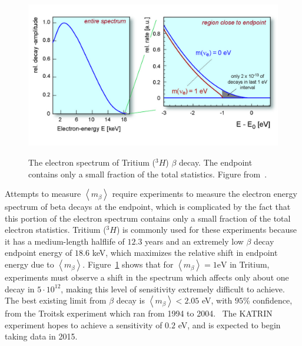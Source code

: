 \begin{figure}
\begin{center}
\includegraphics[keepaspectratio=true,width=\textwidth]{TritiumSpectrum.jpg}
\end{center}
\renewcommand{\baselinestretch}{1}
\small\normalsize
\begin{quote}
\caption{The electron spectrum of Tritium ($^3H$) $\beta$ decay.  The endpoint contains only a small fraction of the total statistics.  Figure from~\cite{Angrik:2005ep}.}
\label{fig:TritiumSpectrum}
\end{quote}
\end{figure}
\renewcommand{\baselinestretch}{2}
\small\normalsize

Attempts to measure $\left< m_\beta \right>$ require experiments to measure the electron energy spectrum of beta decays at the endpoint, which is complicated by the fact that this portion of the electron spectrum contains only a small fraction of the total electron statistics.  Tritium ($^3H$) is commonly used for these experiments because it has a medium-length halflife of $12.3$ years and an extremely low $\beta$ decay endpoint energy of $18.6$ keV, which maximizes the relative shift in endpoint energy due to $\left< m_\beta \right>$.  Figure~\ref{fig:TritiumSpectrum} shows that for $\left< m_\beta \right> = 1\text{eV}$ in Tritium, experiments must observe a shift in the spectrum which affects only about one decay in $5 \cdot 10^{12}$, making this level of sensitivity extremely difficult to achieve.  The best existing limit from $\beta$ decay is $\left<m_\beta\right> < 2.05$ eV, with $95\%$ confidence, from the Troitsk experiment which ran from 1994 to 2004.~\cite{OldTritium}  The KATRIN experiment hopes to achieve a sensitivity of $0.2$ eV, and is expected to begin taking data in 2015.~\cite{NewTritium,NewTritiumTimeline}

